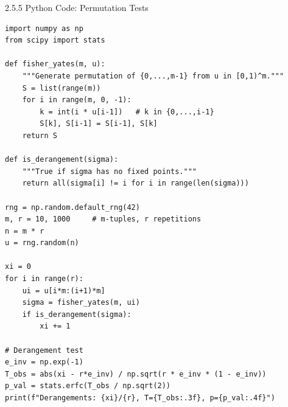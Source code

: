 \documentclass[aspectratio=169,10pt]{beamer}
\begin{document}
\begin{frame}[fragile]{2.5.5 Python Code: Permutation Tests}

\begin{lstlisting}[style=python]
import numpy as np
from scipy import stats

def fisher_yates(m, u):
    """Generate permutation of {0,...,m-1} from u in [0,1)^m."""
    S = list(range(m))
    for i in range(m, 0, -1):
        k = int(i * u[i-1])   # k in {0,...,i-1}
        S[k], S[i-1] = S[i-1], S[k]
    return S

def is_derangement(sigma):
    """True if sigma has no fixed points."""
    return all(sigma[i] != i for i in range(len(sigma)))

rng = np.random.default_rng(42)
m, r = 10, 1000     # m-tuples, r repetitions
n = m * r
u = rng.random(n)

xi = 0
for i in range(r):
    ui = u[i*m:(i+1)*m]
    sigma = fisher_yates(m, ui)
    if is_derangement(sigma):
        xi += 1

# Derangement test
e_inv = np.exp(-1)
T_obs = abs(xi - r*e_inv) / np.sqrt(r * e_inv * (1 - e_inv))
p_val = stats.erfc(T_obs / np.sqrt(2))
print(f"Derangements: {xi}/{r}, T={T_obs:.3f}, p={p_val:.4f}")
\end{lstlisting}

\end{frame}
\end{document}
